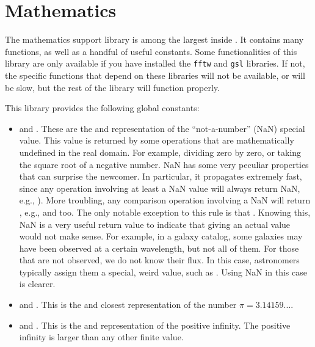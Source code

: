\section{Mathematics \label{SEC:support:math}}

The mathematics support library is among the largest inside \phypp. It contains many functions, as well as a handful of useful constants. Some functionalities of this library are only available if you have installed the \texttt{fftw} and \texttt{gsl} libraries. If not, the specific functions that depend on these libraries will not be available, or will be slow, but the rest of the library will function properly.

This library provides the following global constants:
\begin{itemize}
\item {} and . These are the  and  representation of the ``not-a-number'' (NaN) special value. This value is returned by some operations that are mathematically undefined in the real domain. For example, dividing zero by zero, or taking the square root of a negative number. NaN has some very peculiar properties that can surprise the newcomer. In particular, it propagates extremely fast, since any operation involving at least a NaN value will always return NaN, e.g., ). More troubling, any comparison operation involving a NaN will return \cppfalse, e.g.,  and  too. The only notable exception to this rule is that . Knowing this, NaN is a very useful return value to indicate that giving an actual value would not make sense. For example, in a galaxy catalog, some galaxies may have been observed at a certain wavelength, but not all of them. For those that are not observed, we do not know their flux. In this case, astronomers typically assign them a special, weird value, such as . Using NaN in this case is clearer.

\item {} and . This is the  and  closest representation of the number $\pi = 3.14159...$.

\item {} and . This is the  and  representation of the positive infinity. The positive infinity is larger than any other finite value.
\end{itemize}

